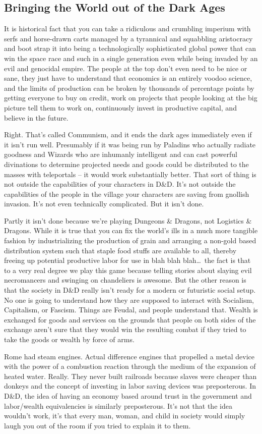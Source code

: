 \subsection{Bringing the World out of the Dark Ages}

It is historical fact that you can take a ridiculous and crumbling imperium with serfs and horse-drawn carts managed by a tyrannical and squabbling aristocracy and boot strap it into being a technologically sophisticated global power that can win the space race and such in a single generation even while being invaded by an evil and genocidal empire. The people at the top don't even need to be nice or sane, they just have to understand that economics is an entirely voodoo science, and the limits of production can be broken by thousands of percentage points by getting everyone to buy on credit, work on projects that people looking at the big picture tell them to work on, continuously invest in productive capital, and believe in the future.

Right. That's called Communism, and it ends the dark ages immediately even if it isn't run well. Presumably if it was being run by Paladins who actually radiate goodness and Wizards who are inhumanly intelligent and can cast powerful divinations to determine projected needs and goods could be distributed to the masses with teleportals -- it would work substantially better. That sort of thing is not outside the capabilities of your characters in D\&D. It's not outside the capabilities of the people in the village your characters are saving from gnollish invasion. It's not even technically complicated. But it isn't done.

Partly it isn't done because we're playing Dungeons \& Dragons, not Logistics \& Dragons. While it is true that you can fix the world's ills in a much more tangible fashion by industrializing the production of grain and arranging a non-gold based distribution system such that staple food stuffs are available to all, thereby freeing up potential productive labor for use in blah blah blah\ldots\  the fact is that to a very real degree we play this game because telling stories about slaying evil necromancers and swinging on chandeliers is awesome. But the other reason is that the society in D\&D really isn't ready for a modern or futuristic social setup. No one is going to understand how they are supposed to interact with Socialism, Capitalism, or Fascism. Things are Feudal, and people understand that. Wealth is exchanged for goods and services on the grounds that people on both sides of the exchange aren't sure that they would win the resulting combat if they tried to take the goods or wealth by force of arms.

Rome had steam engines. Actual difference engines that propelled a metal device with the power of a combustion reaction through the medium of the expansion of heated water. Really. They never built railroads because slaves were cheaper than donkeys and the concept of investing in labor saving devices was preposterous. In D\&D, the idea of having an economy based around trust in the government and labor/wealth equivalencies is similarly preposterous. It's not that the idea wouldn't work, it's that every man, woman, and child in society would simply laugh you out of the room if you tried to explain it to them.
